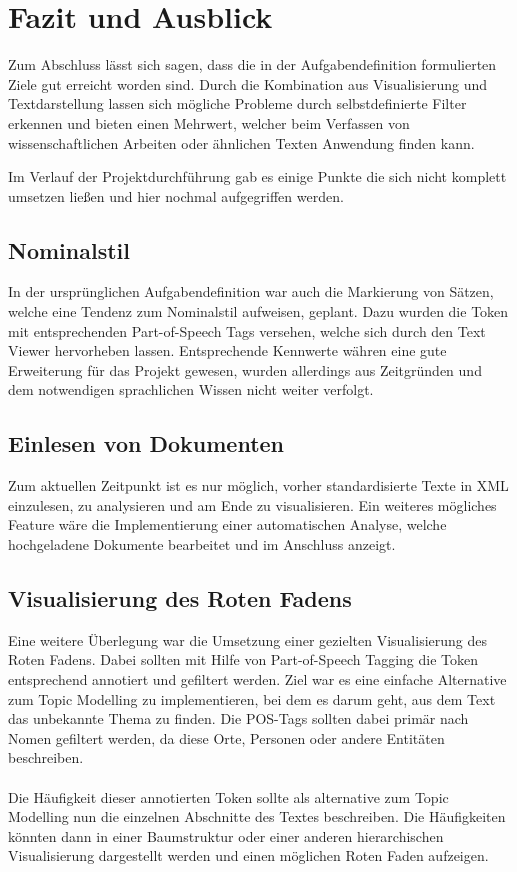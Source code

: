 \section{Fazit und Ausblick}
Zum Abschluss l\"asst sich sagen, dass die in der Aufgabendefinition formulierten Ziele gut erreicht worden sind. Durch die Kombination aus Visualisierung und Textdarstellung lassen sich m\"ogliche Probleme durch selbstdefinierte Filter erkennen und bieten einen Mehrwert, welcher beim Verfassen von wissenschaftlichen Arbeiten oder \"ahnlichen Texten Anwendung finden kann. 

Im Verlauf der Projektdurchf\"uhrung gab es einige Punkte die sich nicht komplett umsetzen ließen und hier nochmal aufgegriffen werden.\\

\subsection*{Nominalstil}
In der urspr\"unglichen Aufgabendefinition war auch die Markierung von S\"atzen, welche eine Tendenz zum Nominalstil aufweisen, geplant. Dazu wurden die Token mit entsprechenden Part-of-Speech Tags versehen, welche sich durch den Text Viewer hervorheben lassen. Entsprechende Kennwerte w\"ahren eine gute Erweiterung f\"ur das Projekt gewesen, wurden allerdings aus Zeitgr\"unden und dem notwendigen sprachlichen Wissen nicht weiter verfolgt.

\subsection*{Einlesen von Dokumenten}
Zum aktuellen Zeitpunkt ist es nur m\"oglich, vorher standardisierte Texte in XML einzulesen, zu analysieren und am Ende zu visualisieren. Ein weiteres m\"ogliches Feature w\"are die Implementierung einer automatischen Analyse, welche hochgeladene Dokumente bearbeitet und im Anschluss anzeigt.

\subsection*{Visualisierung des Roten Fadens}
Eine weitere Überlegung war die Umsetzung einer gezielten Visualisierung des Roten Fadens. Dabei sollten mit Hilfe von Part-of-Speech Tagging die Token entsprechend annotiert und gefiltert werden. Ziel war es eine einfache Alternative zum Topic Modelling zu implementieren, bei dem es darum geht, aus dem Text das unbekannte Thema zu finden. Die POS-Tags sollten dabei prim\"ar nach Nomen gefiltert werden, da diese Orte, Personen oder andere Entit\"aten beschreiben.\\
\\
Die H\"aufigkeit dieser annotierten Token sollte als alternative zum Topic Modelling nun die einzelnen Abschnitte des Textes beschreiben. Die H\"aufigkeiten k\"onnten dann in einer Baumstruktur oder einer anderen hierarchischen Visualisierung dargestellt werden und einen m\"oglichen Roten Faden aufzeigen.

